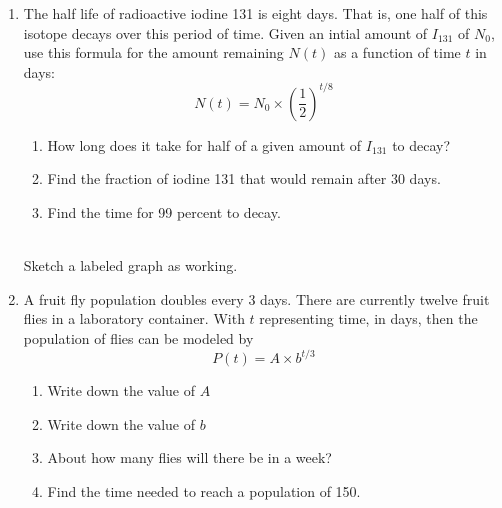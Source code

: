 \documentclass[12pt, twoside]{article}
\begin{document}
\begin{enumerate}
\item The half life of radioactive iodine 131 is eight days. That is, one half of this isotope decays over this period of time. Given an intial amount of $I_{131}$ of $N_0$, use this formula for the amount remaining $N(t)$ as a function of time $t$ in days: \[\displaystyle N(t)=N_0 \times \left( \frac{1}{2} \right)^{t/8}\]  \vspace{0.25cm}
    \begin{multicols}{2}
        \begin{enumerate}[itemsep=0.5cm]
            \item How long does it take for half of a given amount of $I_{131}$ to decay?
            \item Find the fraction of iodine 131 that would remain after 30 days. \vspace{0.75cm}
            \item Find the time for 99 percent to decay.
        \end{enumerate} \vspace{0.5cm}
        \begin{center}
        \\[0.5cm]
        Sketch a labeled graph as working.
        \end{center}
        
    \end{multicols}

\newpage
\item A fruit fly population doubles every 3 days. There are currently twelve fruit flies in a laboratory container. With $t$ representing time, in days, then the population of flies can be modeled by \[\displaystyle P(t)=A \times b^{t/3}\]
    \begin{enumerate}[itemsep=0.75cm]
        \item Write down the value of $A$
        \item Write down the value of $b$
        \item About how many flies will there be in a week? \vspace{1.5cm}
        \item Find the time needed to reach a population of 150.
    \end{enumerate} \vspace{1.5cm}
    

\end{enumerate}
\end{document}
